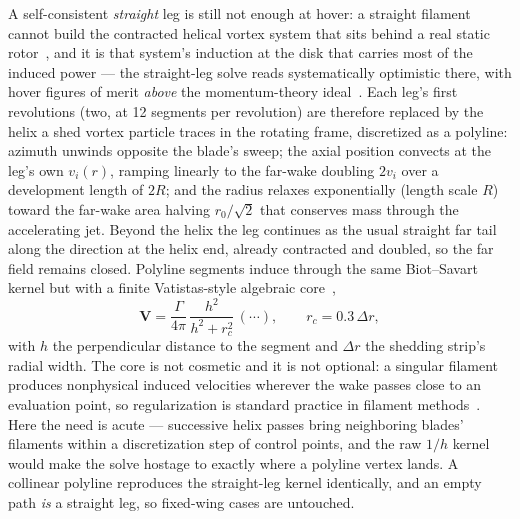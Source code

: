 \documentclass[]{aiaa-tc}%
\begin{document}
A self-consistent \emph{straight} leg is still not enough at hover: a
straight filament cannot build the contracted helical vortex system
that sits behind a real static rotor~\cite{landgrebe1972}, and it is
that system's
induction at the disk that carries most of the induced power --- the
straight-leg solve reads systematically optimistic there, with hover
figures of merit \emph{above} the momentum-theory
ideal~\cite{leishman2006}. Each leg's
first revolutions (two, at 12 segments per revolution) are therefore
replaced by the helix a shed vortex particle traces in the rotating
frame, discretized as a polyline: azimuth unwinds opposite the blade's
sweep; the axial position convects at the leg's own $v_i(r)$, ramping
linearly to the far-wake doubling $2 v_i$ over a development length of
$2R$; and the radius relaxes exponentially (length scale $R$) toward
the far-wake area halving $r_0/\sqrt{2}$ that conserves mass through
the accelerating jet. Beyond the helix the leg continues as the usual
straight far tail along the direction at the helix end, already
contracted and doubled, so the far field remains closed. Polyline
segments induce through the same Biot--Savart kernel but with a
finite Vatistas-style algebraic core~\cite{vatistas1991},
\begin{equation}
 \label{e:core}
 \mathbf{V} = \frac{\Gamma}{4\pi}\,\frac{h^2}{h^2 + r_c^2}\,(\cdots),
 \qquad r_c = 0.3\,\Delta r ,
\end{equation}
with $h$ the perpendicular distance to the segment and $\Delta r$ the
shedding strip's radial width. The core is not cosmetic and it is not
optional: a singular filament produces nonphysical induced velocities
wherever the wake passes close to an evaluation point, so
regularization is standard practice in filament
methods~\cite{leishman2002,lee2022}. Here the need is acute ---
successive
helix passes bring neighboring blades' filaments within a
discretization step of control points, and the raw $1/h$ kernel would
make the solve hostage to exactly where a polyline vertex lands. A
collinear polyline reproduces the straight-leg kernel identically,
and an empty path \emph{is} a straight leg, so fixed-wing cases are
untouched.
\end{document}
